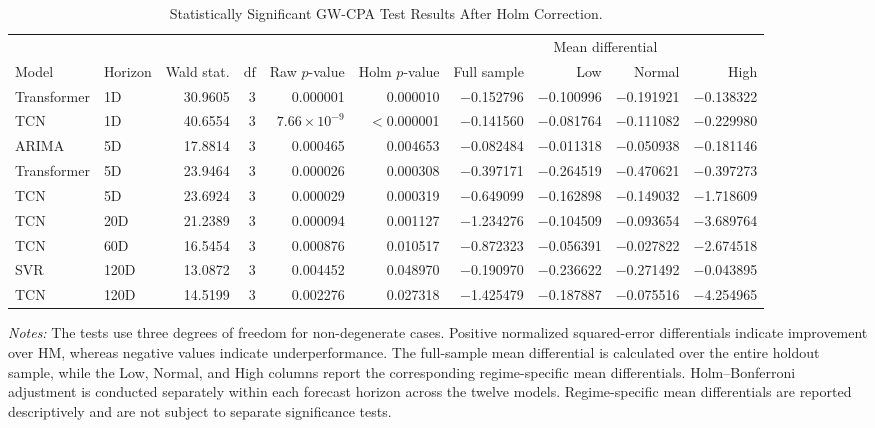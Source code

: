 \documentclass[runningheads,orivec]{llncs}
\begin{document}
\begin{table}[htbp]
\centering
\caption{Statistically Significant GW-CPA Test Results After Holm Correction.}\label{tab:h2_gwcpa_sig}
\setlength{\tabcolsep}{1.8pt}
{\scriptsize
\begin{tabular}{llrrrrrrrr}
\hline
 & & & & & & \multicolumn{4}{c}{Mean differential} \\
\cline{7-10}
Model & Horizon & Wald stat. & $\mathrm{df}$ & Raw $p$-value & Holm $p$-value & Full sample & Low & Normal & High \\
\hline
Transformer & 1D   & 30.9605 & 3 & 0.000001 & 0.000010 & $-$0.152796 & $-$0.100996 & $-$0.191921 & $-$0.138322 \\
TCN         & 1D   & 40.6554 & 3 & $7.66\times 10^{-9}$ & $<$0.000001 & $-$0.141560 & $-$0.081764 & $-$0.111082 & $-$0.229980 \\
ARIMA       & 5D   & 17.8814 & 3 & 0.000465 & 0.004653 & $-$0.082484 & $-$0.011318 & $-$0.050938 & $-$0.181146 \\
Transformer & 5D   & 23.9464 & 3 & 0.000026 & 0.000308 & $-$0.397171 & $-$0.264519 & $-$0.470621 & $-$0.397273 \\
TCN         & 5D   & 23.6924 & 3 & 0.000029 & 0.000319 & $-$0.649099 & $-$0.162898 & $-$0.149032 & $-$1.718609 \\
TCN         & 20D  & 21.2389 & 3 & 0.000094 & 0.001127 & $-$1.234276 & $-$0.104509 & $-$0.093654 & $-$3.689764 \\
TCN         & 60D  & 16.5454 & 3 & 0.000876 & 0.010517 & $-$0.872323 & $-$0.056391 & $-$0.027822 & $-$2.674518 \\
SVR         & 120D & 13.0872 & 3 & 0.004452 & 0.048970 & $-$0.190970 & $-$0.236622 & $-$0.271492 & $-$0.043895 \\
TCN         & 120D & 14.5199 & 3 & 0.002276 & 0.027318 & $-$1.425479 & $-$0.187887 & $-$0.075516 & $-$4.254965 \\
\hline
\end{tabular}
}
\par\vspace{4pt}\parbox{\linewidth}{\scriptsize\textit{Notes:} The tests use three degrees of freedom for non-degenerate cases. Positive normalized squared-error differentials indicate improvement over HM, whereas negative values indicate underperformance. The full-sample mean differential is calculated over the entire holdout sample, while the Low, Normal, and High columns report the corresponding regime-specific mean differentials. Holm--Bonferroni adjustment is conducted separately within each forecast horizon across the twelve models. Regime-specific mean differentials are reported descriptively and are not subject to separate significance tests.}
\end{table}
\end{document}

